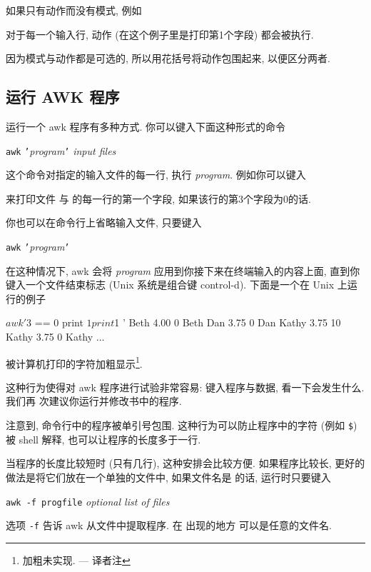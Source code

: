 如果只有动作而没有模式, 例如
对于每一个输入行, 动作 (在这个例子里是打印第1个字段) 都会被执行.

因为模式与动作都是可选的, 所以用花括号将动作包围起来, 以便区分两者.

\subsection{运行 AWK 程序}
\label{running_an_awk_program}

运行一个 awk 程序有多种方式. 你可以键入下面这种形式的命令
\begin{pattern}
    \texttt{awk} \texttt{'}\textit{program}\texttt{'} \textit{input files}
\end{pattern}
这个命令对指定的输入文件的每一行, 执行 \textit{program}. 例如你可以键入
来打印文件  与  的每一行的第一个字段,
如果该行的第3个字段为0的话.

你也可以在命令行上省略输入文件, 只要键入
\begin{pattern}
    \texttt{awk} \texttt{'}\textit{program}\texttt{'}
\end{pattern}
在这种情况下, awk 会将 \textit{program} 应用到你接下来在终端输入的内容上面,
直到你键入一个文件结束标志 (Unix 系统是组合键 control-d). 下面是一个在 Unix
上运行的例子
\begin{myverb}
    $ awk '$3 == 0 { print $1 print $1 }'
    Beth    4.00    0
    Beth
    Dan     3.75    0
    Dan
    Kathy   3.75    10
    Kathy   3.75    0
    Kathy
    ...
\end{myverb}
被计算机打印的字符加粗显示\footnote{加粗未实现. --- 译者注}.

这种行为使得对 awk 程序进行试验非常容易: 键入程序与数据,
看一下会发生什么. 我们再
次建议你运行并修改书中的程序.

注意到, 命令行中的程序被单引号包围. 这种行为可以防止程序中的字符 (例如
\verb'$') 被 shell 解释, 也可以让程序的长度多于一行.

当程序的长度比较短时 (只有几行), 这种安排会比较方便. 如果程序比较长, 更好的
做法是将它们放在一个单独的文件中, 如果文件名是  的话,
运行时只要键入
\begin{pattern}
    \texttt{awk -f progfile} \textit{optional list of files}
\end{pattern}
选项 \verb'-f' 告诉 awk 从文件中提取程序. 在  出现的地方
可以是任意的文件名.

